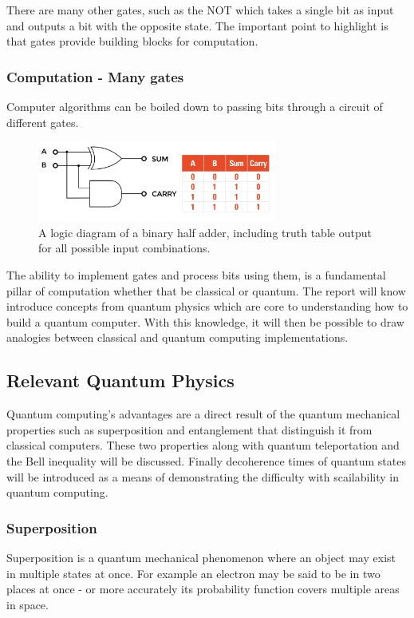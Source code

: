 There are many other gates, such as the NOT which takes a single bit as input and outputs a bit with the opposite state. The important point to highlight is that gates provide building blocks for computation.

\subsubsection{Computation - Many gates}
Computer algorithms can be boiled down to passing bits through a circuit of different gates. 
\begin{figure}[H]
    \centering
    \includegraphics[width=0.7\textwidth]{images/adder.jpeg}
    \caption{A logic diagram of a binary half adder, including truth table output for all possible input combinations. \cite{adder}}\label{fig:ADDER}
\end{figure}

 The ability to implement gates and process bits using them, is a fundamental pillar of computation whether that be classical or quantum. The report will know introduce concepts from quantum physics which are core to understanding how to build a quantum computer. With this knowledge, it will then be possible to draw analogies between classical and quantum computing implementations.

\subsection{Relevant Quantum Physics}

Quantum computing's advantages are a direct result of the quantum mechanical properties such as superposition and entanglement that distinguish it from classical computers. 
These two properties along with quantum teleportation and the Bell inequality will be discussed.
Finally decoherence times of quantum states will be introduced as a means of demonstrating the difficulty with scailability in quantum computing. 


\subsubsection{Superposition}
Superposition is a quantum mechanical phenomenon where an object may exist in multiple states at once. 
For example an electron may be said to be in two places at once - or more accurately its probability function covers multiple areas in space. \cite{noauthor_whatCal_nodate}

